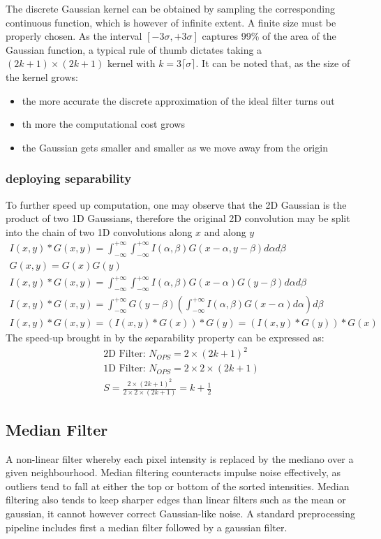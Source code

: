 \documentclass{article}
\begin{document}
The discrete Gaussian kernel can be obtained by sampling the corresponding continuous function, which is however of infinite extent. A finite size must be properly chosen. As the interval $[-3\sigma, +3\sigma]$ captures 99\% of the area of the Gaussian function, a typical rule of thumb dictates taking a $(2k+1)\times(2k+1)$ kernel with $k=3\lceil \sigma \rceil$.
It can be noted that, as the size of the kernel grows:
\begin{itemize}
    \item the more accurate the discrete approximation of the ideal filter turns out
    \item th more the computational cost grows
    \item the Gaussian gets smaller and smaller as we move away from the origin
\end{itemize}
\subsubsection{deploying separability}
To further speed up computation, one may observe that the 2D Gaussian is the product of two 1D Gaussians, therefore the original 2D convolution may be split into the chain of two 1D convolutions along $x$ and along $y$
\begin{gather}
    I(x,y) \ast G(x,y) = \int_{-\infty}^{+\infty}\int_{-\infty}^{+\infty}I(\alpha,\beta)G(x-\alpha,y-\beta)d\alpha d\beta\\
    G(x,y)=G(x)G(y)\\
    I(x,y)\ast G(x,y) = \int_{-\infty}^{+\infty}\int_{-\infty}^{+\infty} I(\alpha,\beta)G(x-\alpha)G(y-\beta)d\alpha d\beta\\
    I(x,y)\ast G(x,y) = \int_{-\infty}^{+\infty}G(y-\beta)\left(\int_{-\infty}^{+\infty} I(\alpha,\beta)G(x-\alpha)d\alpha \right) d\beta\\
    I(x,y)\ast G(x,y) = (I(x,y)\ast G(x))\ast G(y) = (I(x,y) \ast G(y)) \ast G(x)
\end{gather}
The speed-up brought in by the separability property can be expressed as:
\begin{gather}
    \text{2D Filter: } N_{OPS} = 2\times(2k+1)^2\\
    \text{1D Filter: } N_{OPS} = 2\times2\times(2k+1)\\
    S=\frac{2\times(2k+1)^2}{ 2\times2\times(2k+1) } = k+ \frac{1}{2}
\end{gather}
\subsection{Median Filter}
A non-linear filter whereby each pixel intensity is replaced by the mediano over a given neighbourhood. Median filtering counteracts impulse noise effectively, as outliers tend to fall at either the top or bottom of the sorted intensities. Median filtering also tends to keep sharper edges than linear filters such as the mean or gaussian, it cannot however correct Gaussian-like noise. A standard preprocessing pipeline includes first a median filter followed by a gaussian filter.
\end{document}
